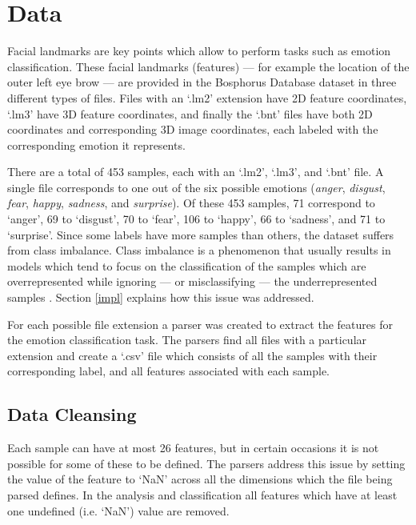 \section{Data}

Facial landmarks are key points which allow to perform tasks such as emotion classification. These facial landmarks (features) --- for example the location of the outer left eye brow --- are provided in the Bosphorus Database dataset in three different types of files. Files with an `.lm2' extension have 2D feature coordinates, `.lm3' have 3D feature coordinates, and finally the `.bnt' files have both 2D coordinates and corresponding 3D image coordinates, each labeled with the corresponding emotion it represents.

There are a total of 453 samples, each with an `.lm2', `.lm3', and `.bnt' file. A single file corresponds to one out of the six possible emotions (\textit{anger}, \textit{disgust}, \textit{fear}, \textit{happy}, \textit{sadness}, and \textit{surprise}). Of these 453 samples, 71 correspond to `anger', 69 to `disgust', 70 to `fear', 106 to `happy', 66 to `sadness', and 71 to `surprise'. Since some labels have more samples than others, the dataset suffers from class imbalance. Class imbalance is a phenomenon that usually results in models which tend to focus on the classification of the samples which are overrepresented while ignoring --- or misclassifying --- the underrepresented samples \cite{data-mining-intro}. Section \ref{impl} explains how this issue was addressed.

For each possible file extension a parser was created to extract the features for the emotion classification task. The parsers find all files with a particular extension and create a `.csv' file which consists of all the samples with their corresponding label, and all features associated with each sample.

\subsection{Data Cleansing}

Each sample can have at most 26 features, but in certain occasions it is not possible for some of these to be defined. The parsers address this issue by setting the value of the feature to `NaN' across all the dimensions which the file being parsed defines. In the analysis and classification all features which have at least one undefined (i.e. `NaN') value are removed.

